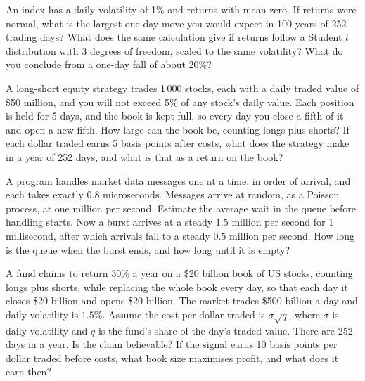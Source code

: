 \begin{question}\label{iq:iv1:estimation:22}
An index has a daily volatility of 1\% and returns with mean zero. If returns were normal, what is the largest one-day move you would expect in 100 years of 252 trading days? What does the same calculation give if returns follow a Student $t$ distribution with 3 degrees of freedom, scaled to the same volatility? What do you conclude from a one-day fall of about 20\%?
\end{question}

\begin{question}\label{iq:iv1:estimation:23}
A long-short equity strategy trades 1\,000 stocks, each with a daily traded value of \$50 million, and you will not exceed 5\% of any stock's daily value. Each position is held for 5 days, and the book is kept full, so every day you close a fifth of it and open a new fifth. How large can the book be, counting longs plus shorts? If each dollar traded earns 5 basis points after costs, what does the strategy make in a year of 252 days, and what is that as a return on the book?
\end{question}

\begin{question}\label{iq:iv1:estimation:24}
A program handles market data messages one at a time, in order of arrival, and each takes exactly $0.8$ microseconds. Messages arrive at random, as a Poisson process, at one million per second. Estimate the average wait in the queue before handling starts. Now a burst arrives at a steady $1.5$ million per second for 1 millisecond, after which arrivals fall to a steady $0.5$ million per second. How long is the queue when the burst ends, and how long until it is empty?
\end{question}

\begin{question}\label{iq:iv1:estimation:25}
A fund claims to return 30\% a year on a \$20 billion book of US stocks, counting longs plus shorts, while replacing the whole book every day, so that each day it closes \$20 billion and opens \$20 billion. The market trades \$500 billion a day and daily volatility is $1.5\%$. Assume the cost per dollar traded is $\sigma\sqrt{q}$, where $\sigma$ is daily volatility and $q$ is the fund's share of the day's traded value. There are 252 days in a year. Is the claim believable? If the signal earns 10 basis points per dollar traded before costs, what book size maximises profit, and what does it earn then?
\end{question}
